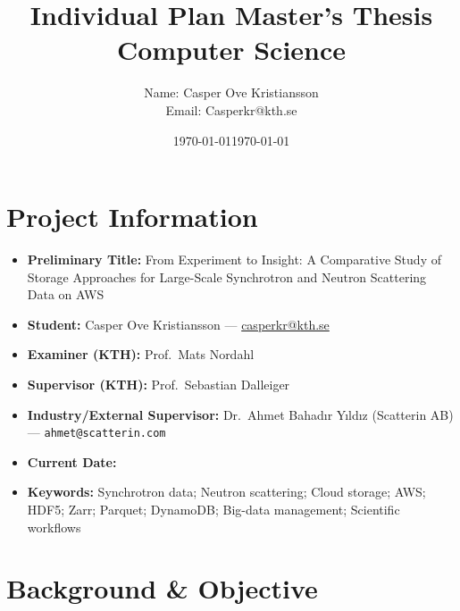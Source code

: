 \documentclass{article}
\title{Individual Plan Master's Thesis\\Computer Science}
\author{Name: Casper Ove Kristiansson\\Email: Casperkr@kth.se}
\date{\today}
\begin{document}
\setlength\parindent{0pt}
\maketitle

\section{Project Information}
\begin{itemize}
  \item \textbf{Preliminary Title:} From Experiment to Insight: A Comparative Study of Storage Approaches for Large-Scale Synchrotron and Neutron Scattering Data on AWS
  \item \textbf{Student:} Casper Ove Kristiansson — \href{mailto:casperkr@kth.se}{casperkr@kth.se}
  \item \textbf{Examiner (KTH):} Prof.\ Mats Nordahl
  \item \textbf{Supervisor (KTH):} Prof.\ Sebastian Dalleiger
  \item \textbf{Industry/External Supervisor:} Dr.\ Ahmet Bahadır Yıldız (Scatterin AB) — \texttt{ahmet@scatterin.com}
  \item \textbf{Current Date:} \date{\today}
  \item \textbf{Keywords:} Synchrotron data; Neutron scattering; Cloud storage; AWS; HDF5; Zarr; Parquet; DynamoDB; Big-data management; Scientific workflows
\end{itemize}

\section{Background \& Objective}

\end{document}
